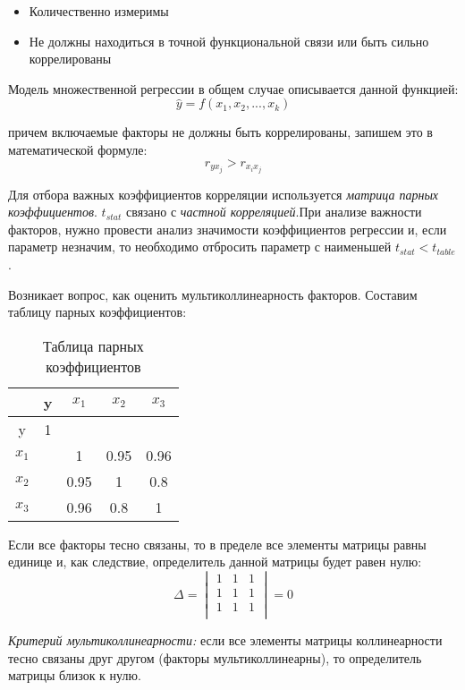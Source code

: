 \documentclass[aps,%
12pt,%
final,%
oneside,
onecolumn,%
musixtex, %
superscriptaddress,%
centertags]{article} %
\begin{document}
\begin{itemize}
	\item Количественно измеримы
	\item Не должны находиться в точной функциональной связи или быть сильно коррелированы
\end{itemize}

Модель множественной регрессии в общем случае описывается данной функцией:
$$ \widehat{y} = f(x_1,x_2,...,x_k) $$

причем включаемые факторы не должны быть коррелированы, запишем это в математической формуле:
$$ r_{yx_j} > r_{x_i{x_j}} $$

Для отбора важных коэффициентов корреляции используется \textit{матрица парных коэффициентов}. 
$t_{stat}$ связано с \textit{частной корреляцией}.При анализе важности факторов, нужно провести анализ значимости коэффициентов регрессии и, если параметр незначим, то необходимо отбросить параметр с наименьшей $t_{stat}< t_{table}$.

Возникает вопрос, как оценить мультиколлинеарность факторов. Составим таблицу парных коэффициентов:
\begin{table}[H]
	\begin{center}
		\begin{tabular}{|c|c|c|c|c|} \hline
		& y & $x_1$ & $x_2$ & $x_3$ \\ \hline
		y & 1 &  &  &   \\ \hline
		$x_1$ &  & 1 & 0.95 & 0.96 \\ \hline
		$x_2$ &  & 0.95 & 1 & 0.8 \\ \hline
		$x_3$ &  & 0.96 & 0.8 & 1 \\ \hline
		\end{tabular}
	\caption{Таблица парных коэффициентов}
	\end{center}
\end{table}

Если все факторы тесно связаны, то в пределе все элементы матрицы равны единице и, как следствие, определитель данной матрицы будет равен нулю:
$$ \Delta =
\begin{vmatrix}
	1 & 1 & 1 \\
	1 & 1 & 1 \\
	1 & 1 & 1 \\
\end{vmatrix} = 0
$$

\textit{Критерий мультиколлинеарности:} если все элементы матрицы коллинеарности тесно связаны друг другом (факторы мультиколлинеарны), то определитель матрицы близок к нулю. 
\end{document}

